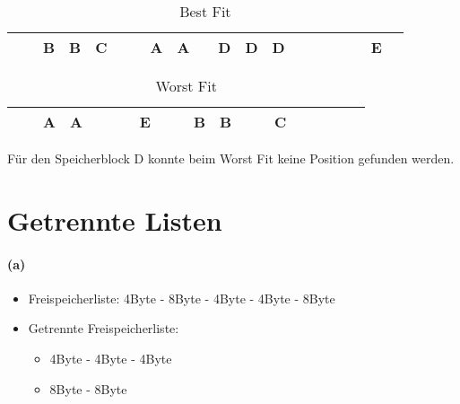 \documentclass[a4paper]{article}
\begin{document}
\begin{table}[h]
    \centering
    \begin{tabular}{|c|c|c|c|c|c|c|c|c|c|c|c|c|c|c|c|c|c|c|c|}
    \toprule
          \cellcolor{gray} &
          \cellcolor{gray} &
          B&
          B&
          C&
          \cellcolor{gray}&
          \cellcolor{gray}&
          A&
          A&
          \cellcolor{gray}&
          D&
          D&
          D&
          \cellcolor{gray}&
          &
          &
          &
          \cellcolor{gray}&
          E&  
          \cellcolor{gray}\\
          \bottomrule
    \end{tabular}
    \caption{Best Fit}
    \label{tab:my_label}
\end{table}

\begin{table}[h]
    \centering
    \begin{tabular}{|c|c|c|c|c|c|c|c|c|c|c|c|c|c|c|c|c|c|c|c|}
    \toprule
          \cellcolor{gray} &
          \cellcolor{gray} &
          A&
          A&
          &
          \cellcolor{gray}&
          \cellcolor{gray}&
          E&
          &
          \cellcolor{gray}&
          B&
          B&
          &
          \cellcolor{gray}&
          C&
          &
          &
          \cellcolor{gray}&
          &  
          \cellcolor{gray}\\
          \bottomrule
    \end{tabular}
    \caption{Worst Fit}
    \label{tab:my_label}
\end{table}
Für den Speicherblock D konnte beim Worst Fit keine Position gefunden werden.

\newpage
\section{Getrennte Listen}
\paragraph{(a)}
\begin{itemize}
    \item Freispeicherliste: 4Byte - 8Byte - 4Byte - 4Byte - 8Byte
    \item Getrennte Freispeicherliste: 
    \begin{itemize}
        \item 4Byte - 4Byte - 4Byte
        \item 8Byte - 8Byte
    \end{itemize}
\end{itemize}
\end{document}
